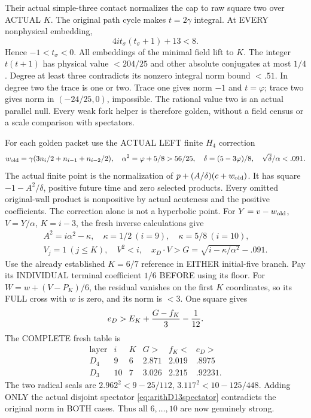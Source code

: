 \documentclass[11pt]{article}
\begin{document}
Their actual simple-three contact normalizes the
cap to raw square two over ACTUAL \(K\).
The original path cycle makes \(t=2\gamma\) integral.
At EVERY nonphysical embedding,
\[
                     4it_\sigma(t_\sigma+1)+13<8 .
\]
Hence \(-1<t_\sigma<0\).
All embeddings of the minimal field lift to \(K\).
The integer \(t(t+1)\) has physical value \(<204/25\)
and other absolute conjugates at most \(1/4\).
Degree at least three contradicts its nonzero
integral norm bound \(<.51\).
In degree two the trace is one or two.
Trace one gives norm \(-1\) and \(t=\varphi\);
trace two gives norm in \((-24/25,0)\), impossible.
The rational value two is an actual parallel null.
Every weak fork helper is therefore golden,
without a field census or a scale comparison
with spectators.

For each golden packet use the ACTUAL LEFT finite
\(H_4\) correction
\[
 w_{\rm old}=\gamma(3n_i/2+n_{i-1}+n_{i-2}/2),\quad
 \alpha^2=\varphi+5/8>56/25,\quad
 \delta=(5-3\varphi)/8,\quad \sqrt\delta/\alpha<.091 .
\]
The actual finite point is the normalization of
\(p+(A/\delta)(c+w_{\rm old})\).
It has square \(-1-A^2/\delta\), positive future
time and zero selected products.
Every omitted original-wall product is nonpositive
by actual acuteness and the positive coefficients.
The correction alone is not a hyperbolic point.
For \(Y=v-w_{\rm old}\), \(V=Y/\alpha\), \(K=i-3\),
the fresh inverse calculations give
\[
 \begin{gathered}
 A^2=i\alpha^2-\kappa,\quad
 \kappa=1/2\ (i=9),\quad \kappa=5/8\ (i=10),\\
 V_j=1\ (j\le K),\quad V^2<i,\quad
 x_D\cdot V>G=\sqrt{i-\kappa/\alpha^2}-.091 .
 \end{gathered}
\]
Use the already established \(K=6/7\) reference
in EITHER initial-five branch.
Pay its INDIVIDUAL terminal coefficient \(1/6\)
BEFORE using its floor.
For \(W=w+(V-P_K)/6\), the residual vanishes
on the first \(K\) coordinates, so its FULL
cross with \(w\) is zero, and its norm is \(<3\).
One square gives
\[
                         e_D>E_K+{G-f_K\over3}-{1\over12}.
\]
The COMPLETE fresh table is
\[
\begin{array}{c|c|c|c|c|c}
 \text{layer}&i&K&G>&f_K<&e_D>\\ \hline
 D_4&9&6&2.871&2.019&.8975\\
 D_3&10&7&3.026&2.215&.92231 .
\end{array}
\]
The two radical seals are
\(2.962^2<9-25/112\),
\(3.117^2<10-125/448\).
Adding ONLY the actual disjoint spectator
\eqref{eq:arithD13spectator} contradicts the
original norm in BOTH cases.
Thus all \(6,\ldots,10\) are now genuinely strong.
\end{document}
